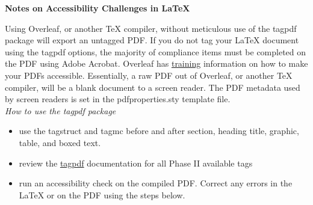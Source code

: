 \begin{titlepage}
\textbf{Notes on Accessibility Challenges in LaTeX}

Using Overleaf, or another TeX compiler, without meticulous use of the tagpdf package will export an untagged PDF. If you do not tag your LaTeX document using the tagpdf options, the majority of compliance items must be completed on the PDF using Adobe Acrobat. Overleaf has \href{https://www.overleaf.com/learn/latex/An_introduction_to_tagged_PDF_files%3A_internals_and_the_challenges_of_accessibility}{training} information on how to make your PDFs accessible. Essentially, a raw PDF out of Overleaf, or another TeX compiler, will be a blank document to a screen reader. The PDF metadata used by screen readers is set in the pdfproperties.sty template file.\\
\emph{How to use the tagpdf package}
\begin{itemize}[nospace]
\item use the tagstruct and tagmc before and after section, heading title, graphic, table, and boxed text.
\item review the \href{https://github.com/u-fischer/tagpdf}{tagpdf} documentation for all Phase II available tags
\item run an accessibility check on the compiled PDF. Correct any errors in the LaTeX or on the PDF using the steps below.
\end{itemize}


\end{titlepage}
